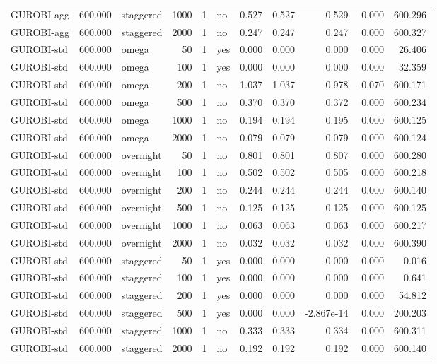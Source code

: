 \begin{table}[htbp]
\begin{tabular}{lrlrrlrrrrr}
GUROBI-agg & 600.000 & staggered & 1000 & 1 & no & 0.527 & 0.527 & 0.529 & 0.000 & 600.296 \\
GUROBI-agg & 600.000 & staggered & 2000 & 1 & no & 0.247 & 0.247 & 0.247 & 0.000 & 600.327 \\
GUROBI-std & 600.000 & omega & 50 & 1 & yes & 0.000 & 0.000 & 0.000 & 0.000 & 26.406 \\
GUROBI-std & 600.000 & omega & 100 & 1 & yes & 0.000 & 0.000 & 0.000 & 0.000 & 32.359 \\
GUROBI-std & 600.000 & omega & 200 & 1 & no & 1.037 & 1.037 & 0.978 & -0.070 & 600.171 \\
GUROBI-std & 600.000 & omega & 500 & 1 & no & 0.370 & 0.370 & 0.372 & 0.000 & 600.234 \\
GUROBI-std & 600.000 & omega & 1000 & 1 & no & 0.194 & 0.194 & 0.195 & 0.000 & 600.125 \\
GUROBI-std & 600.000 & omega & 2000 & 1 & no & 0.079 & 0.079 & 0.079 & 0.000 & 600.124 \\
GUROBI-std & 600.000 & overnight & 50 & 1 & no & 0.801 & 0.801 & 0.807 & 0.000 & 600.280 \\
GUROBI-std & 600.000 & overnight & 100 & 1 & no & 0.502 & 0.502 & 0.505 & 0.000 & 600.218 \\
GUROBI-std & 600.000 & overnight & 200 & 1 & no & 0.244 & 0.244 & 0.244 & 0.000 & 600.140 \\
GUROBI-std & 600.000 & overnight & 500 & 1 & no & 0.125 & 0.125 & 0.125 & 0.000 & 600.125 \\
GUROBI-std & 600.000 & overnight & 1000 & 1 & no & 0.063 & 0.063 & 0.063 & 0.000 & 600.217 \\
GUROBI-std & 600.000 & overnight & 2000 & 1 & no & 0.032 & 0.032 & 0.032 & 0.000 & 600.390 \\
GUROBI-std & 600.000 & staggered & 50 & 1 & yes & 0.000 & 0.000 & 0.000 & 0.000 & 0.016 \\
GUROBI-std & 600.000 & staggered & 100 & 1 & yes & 0.000 & 0.000 & 0.000 & 0.000 & 0.641 \\
GUROBI-std & 600.000 & staggered & 200 & 1 & yes & 0.000 & 0.000 & 0.000 & 0.000 & 54.812 \\
GUROBI-std & 600.000 & staggered & 500 & 1 & yes & 0.000 & 0.000 & -2.867e-14 & 0.000 & 200.203 \\
GUROBI-std & 600.000 & staggered & 1000 & 1 & no & 0.333 & 0.333 & 0.334 & 0.000 & 600.311 \\
GUROBI-std & 600.000 & staggered & 2000 & 1 & no & 0.192 & 0.192 & 0.192 & 0.000 & 600.140 \\
\bottomrule
\end{tabular}
\end{table}
